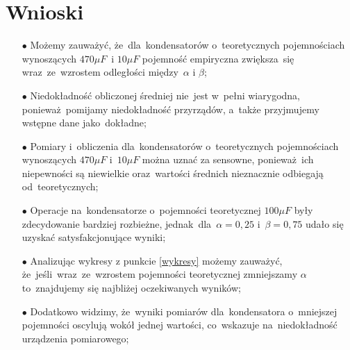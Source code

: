 \documentclass[12pt]{mwart}
\begin{document}
	\section{Wnioski}
	\begin{itemize}
		\item[$\bullet$] Możemy zauważyć, że~dla~kondensatorów o~teoretycznych pojemnościach wynoszących $470\mu F$~i $10\mu F$ pojemność empiryczna zwiększa~się wraz~ze~wzrostem odległości między~$\alpha$ i $\beta$;
		\item[$\bullet$] Niedokładność obliczonej średniej nie~jest w~pełni wiarygodna, ponieważ~pomijamy niedokładność przyrządów, a~także przyjmujemy wstępne dane jako~dokładne;
		\item[$\bullet$] Pomiary i~obliczenia dla~kondensatorów o~teoretycznych pojemnościach wynoszących $470\mu F$ i~$10\mu F$ można uznać za sensowne, ponieważ~ich niepewności są niewielkie oraz~wartości średnich nieznacznie odbiegają od~teoretycznych;
		\item[$\bullet$] Operacje na~kondensatorze o~pojemności teoretycznej $100\mu F$ były zdecydowanie bardziej rozbieżne, jednak~dla~$\alpha=0,25$ i~$\beta=0,75$ udało się uzyskać satysfakcjonujące wyniki;
		\item[$\bullet$] Analizując wykresy z punkcie \eqref{wykresy} możemy zauważyć, że~jeśli~wraz~ze~wzrostem pojemności teoretycznej zmniejszamy $\alpha$ to~znajdujemy się najbliżej oczekiwanych wyników;
		\item[$\bullet$] Dodatkowo widzimy, że~wyniki pomiarów dla~kondensatora o~mniejszej pojemności oscylują wokół jednej wartości, co~wskazuje na~niedokładność urządzenia pomiarowego;
		
	\end{itemize}
\end{document}
